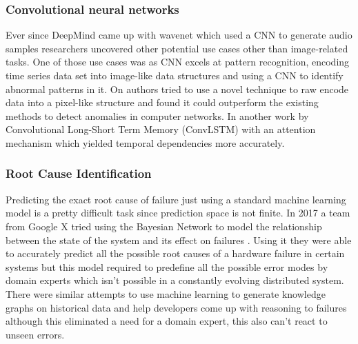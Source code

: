 \subsubsection{Convolutional neural networks}

Ever since DeepMind came up with wavenet which used a CNN to generate audio samples \citep{oord2016wavenet} researchers uncovered other potential use cases other than image-related tasks. One of those use cases was as CNN excels at pattern recognition, encoding time series data set into image-like data structures and using a CNN to identify abnormal patterns in it. On \cite{kim2018encoding} authors tried to use a novel technique to raw encode data into a pixel-like structure and found it could outperform the existing methods to detect anomalies in computer networks. In another work by \cite{zhang2019deep} Convolutional Long-Short Term Memory (ConvLSTM) with an attention mechanism which yielded temporal dependencies more accurately. 


\subsubsection{Root Cause Identification}

Predicting the exact root cause of failure just using a standard machine learning model is a pretty difficult task since prediction space is not finite. In 2017 a team from Google X tried using the Bayesian Network to model the relationship between the state of the system and its effect on failures \citep{chigurupati2017root}. Using it they were able to accurately predict all the possible root causes of a hardware failure in certain systems but this model required to predefine all the possible error modes by domain experts which isn't possible in a constantly evolving distributed system. There were similar attempts \cite{gonzalez2017root} to use machine learning to generate knowledge graphs on historical data and help developers come up with reasoning to failures although this eliminated a need for a domain expert, this also can't react to unseen errors.


